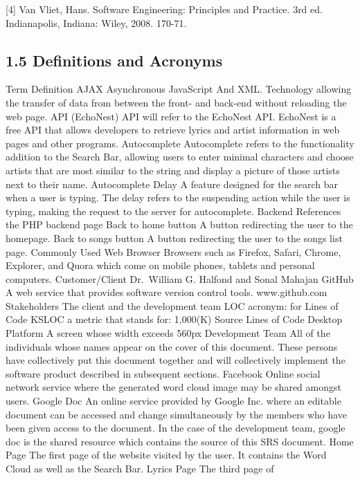 \documentclass[]{article}
\begin{document}
{[}4{]} Van Vliet, Hans. Software Engineering: Principles and Practice.
3rd ed. Indianapolis, Indiana: Wiley, 2008. 170-71.

\subsection{1.5 Definitions and
Acronyms}\label{definitions-and-acronyms}

Term Definition AJAX Asynchronous JavaScript And XML. Technology
allowing the transfer of data from between the front- and back-end
without reloading the web page. API (EchoNest) API will refer to the
EchoNest API. EchoNest is a free API that allows developers to retrieve
lyrics and artist information in web pages and other programs.
Autocomplete Autocomplete refers to the functionality addition to the
Search Bar, allowing users to enter minimal characters and choose
artists that are most similar to the string and display a picture of
those artists next to their name. Autocomplete Delay A feature designed
for the search bar when a user is typing. The delay refers to the
suspending action while the user is typing, making the request to the
server for autocomplete. Backend References the PHP backend page Back to
home button A button redirecting the user to the homepage. Back to songs
button A button redirecting the user to the songs list page. Commonly
Used Web Browser Browsers such as Firefox, Safari, Chrome, Explorer, and
Quora which come on mobile phones, tablets and personal computers.
Customer/Client Dr.~William G. Halfond and Sonal Mahajan GitHub A web
service that provides software version control tools. www.github.com
Stakeholders The client and the development team LOC acronym: for Lines
of Code KSLOC a metric that stands for: 1,000(K) Source Lines of Code
Desktop Platform A screen whose width exceeds 560px Development Team All
of the individuals whose names appear on the cover of this document.
These persons have collectively put this document together and will
collectively implement the software product described in subsequent
sections. Facebook Online social network service where the generated
word cloud image may be shared amongst users. Google Doc An online
service provided by Google Inc. where an editable document can be
accessed and change simultaneously by the members who have been given
access to the document. In the case of the development team, google doc
is the shared resource which contains the source of this SRS document.
Home Page The first page of the website visited by the user. It contains
the Word Cloud as well as the Search Bar. Lyrics Page The third page of
\end{document}
